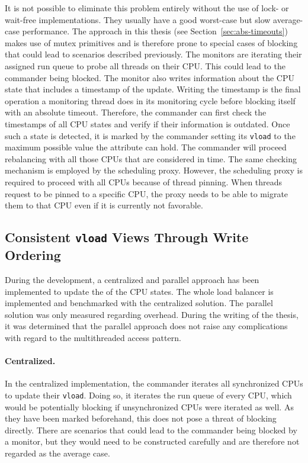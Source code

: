 It is not possible to eliminate this problem entirely without the use of lock- or wait-free implementations.
They usually have a good worst-case but slow average-case performance.
The approach in this thesis (see Section~\ref{sec:abs-timeouts}) makes use of mutex primitives and is therefore prone to special cases of blocking that could lead to scenarios described previously.
The monitors are iterating their assigned run queue to probe all threads on their CPU.
This could lead to the commander being blocked.
The monitor also writes information about the CPU state that includes a timestamp of the update.
Writing the timestamp is the final operation a monitoring thread does in its monitoring cycle before blocking itself with an absolute timeout.
Therefore, the commander can first check the timestamps of all CPU states and verify if their information is outdated.
Once such a state is detected, it is marked by the commander setting its \texttt{vload} to the maximum possible value the attribute can hold.
The commander will proceed rebalancing with all those CPUs that are considered in time.
The same checking mechanism is employed by the scheduling proxy.
However, the scheduling proxy is required to proceed with all CPUs because of thread pinning.
When threads request to be pinned to a specific CPU, the proxy needs to be able to migrate them to that CPU even if it is currently not favorable.

\subsection{Consistent \texttt{vload} Views Through Write Ordering}
\label{sec:vload-updates}

During the development, a centralized and parallel approach has been implemented to update the  of the CPU states.
The whole load balancer is implemented and benchmarked with the centralized solution.
The parallel solution was only measured regarding overhead.
During the writing of the thesis, it was determined that the parallel approach does not raise any complications with regard to the multithreaded access pattern.

\paragraph{Centralized.}

In the centralized implementation, the commander iterates all synchronized CPUs to update their \texttt{vload}.
Doing so, it iterates the run queue of every CPU, which would be potentially blocking if unsynchronized CPUs were iterated as well.
As they have been marked beforehand, this does not pose a threat of blocking directly.
There are scenarios that could lead to the commander being blocked by a monitor, but they would need to be constructed carefully and are therefore not regarded as the average case.

